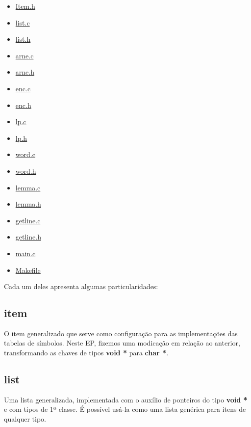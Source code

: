 \documentclass[a4paper,12pt]{article}
\begin{document}
    \begin{itemize}
      \item \href{run:./Item.h}{Item.h}
      \item \href{run:./list.c}{list.c}
      \item \href{run:./list.h}{list.h}
      \item \href{run:./arne.c}{arne.c}
      \item \href{run:./arne.h}{arne.h}
      \item \href{run:./enc.c}{enc.c}
      \item \href{run:./enc.h}{enc.h}
      \item \href{run:./lp.c}{lp.c}
      \item \href{run:./lp.h}{lp.h}
      \item \href{run:./word.c}{word.c}
      \item \href{run:./word.h}{word.h}
      \item \href{run:./lemma.c}{lemma.c}
      \item \href{run:./lemma.h}{lemma.h}
      \item \href{run:./getline.c}{getline.c}
      \item \href{run:./getline.h}{getline.h}
      \item \href{run:./main.c}{main.c}
      \item \href{run:./Makefile}{Makefile}
    \end{itemize}
    
    Cada um deles apresenta algumas particularidades:
    
    \subsection{item} 
        O item generalizado que serve como configuração para as     
        implementações das tabelas de símbolos. Neste EP, fizemos uma 
        modicação em relação ao anterior, transformando as chaves de
        tipos \textbf{void *} para \textbf{char *}.

    \subsection{list} 
        Uma lista generalizada, implementada com o auxílio de ponteiros
        do tipo \textbf{void *} e com tipos de 1ª classe. É possível
        usá-la como uma lista genérica para itens de qualquer tipo.
\end{document}

